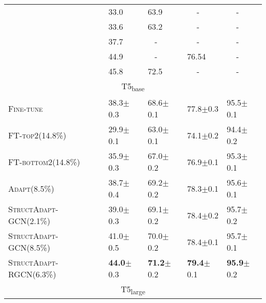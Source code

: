 \documentclass[11pt]{article}
\newcommand{\graphadapter}{{\small\textsc{StructAdapt}}\xspace}
\newcommand{\vanilladapter}{{\small\textsc{Adapt}}\xspace}
\newcommand{\finetune}{{\small\textsc{Fine-tune}}\xspace}
\newcommand{\finetunetop}{{\small\textsc{FT-top2}}\xspace}
\newcommand{\finetunebottom}{{\small\textsc{FT-bottom2}}\xspace}
\begin{document}
\begin{table}[t]
{{\begin{tabular}{@{\hspace*{1mm}}l@{\hspace*{3mm}}l@{\hspace*{3mm}}l@{\hspace*{3mm}}l@{\hspace*{3mm}}l@{\hspace*{1mm}}}
\citet{mager2020gpttoo} & 33.0 & 63.9 & \,\,\,\,\,\,\,- & \,\,\,\,\,\,\,-\\
\citet{zhang-etal-2020-lightweight} & 33.6 & 63.2 & \,\,\,\,\,\,\,- & \,\,\,\,\,\,\,-\\
\citet{harkous2020text} & 37.7 & \,\,\,\,\,- & \,\,\,\,\,\,\,- & \,\,\,\,\,\,\,-\\
\citet{hoyle2020promoting} & 44.9 & \,\,\,\,\,- & 76.54 & \,\,\,\,\,\,\,-\\
\citet{ribeiro2020investigating} & 45.8 & 72.5 & \,\,\,\,\,\,\,- & \,\,\,\,\,\,\,-\\[0.15cm]
\toprule
 \multicolumn{5}{c}{T5\textsubscript{base}}   \\
 \midrule
\finetune & 38.3{\small $\pm$0.3} & 68.6{\small $\pm$0.1} & 77.8{\small $\pm$0.3} & 95.5{\small $\pm$0.1}\\
\finetunetop{\small(14.8\%)} & 29.9{\small $\pm$0.1} & 63.0{\small $\pm$0.1} & 74.1{\small $\pm$0.2} & 94.4{\small $\pm$0.2}\\
\finetunebottom{\small(14.8\%)} & 35.9{\small $\pm$0.3} & 67.0{\small $\pm$0.2} & 76.9{\small $\pm$0.1} & 95.3{\small $\pm$0.1}\\
\vanilladapter{\small(8.5\%)} & 38.7{\small $\pm$0.4} & 69.2{\small $\pm$0.2} & 78.3{\small $\pm$0.1} & 95.6{\small $\pm$0.1}\\
\graphadapter{\small-GCN(2.1\%)} & 39.0{\small $\pm$0.3} & 69.1{\small $\pm$0.2} & 78.4{\small $\pm$0.2} & 95.7{\small $\pm$0.2}\\
\graphadapter{\small-GCN(8.5\%)} & 41.0{\small $\pm$0.5} & 70.0{\small $\pm$0.2} & 78.4{\small $\pm$0.1} & 95.7{\small $\pm$0.1}\\
\graphadapter{\small-RGCN(6.3\%)} & \textbf{44.0}{\small $\pm$0.3} &
\textbf{71.2}{\small $\pm$0.2} & \textbf{79.4}{\small $\pm$0.1} &
\textbf{95.9}{\small $\pm$0.2}\\

\midrule
\multicolumn{5}{c}{T5\textsubscript{large}}   \\


\end{tabular}}}
\end{table}
\end{document}
